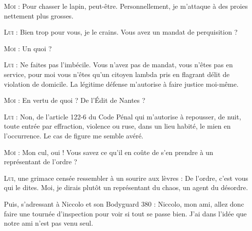 \begin{dialogue}
\textsc{Moi} : Pour chasser le lapin, peut-être. Personnellement, je m’attaque à des proies nettement plus grosses.

\textsc{Lui} : Bien trop pour vous, je le crains. Vous avez un mandat de perquisition ?

\textsc{Moi} : Un quoi ?

\textsc{Lui} : Ne faites pas l’imbécile. Vous n’avez pas de mandat, vous n’êtes pas en service, pour moi vous n’êtes qu’un citoyen lambda pris en flagrant délit de violation de domicile. La légitime défense m’autorise à faire justice moi-même.

\textsc{Moi} : En vertu de quoi ? De l’Édit de Nantes ?

%

\textsc{Lui} : Non, de l’article 122-6 du Code Pénal qui m’autorise à repousser, de nuit, toute entrée par effraction, violence ou ruse, dans un lieu habité, le mien en l’occurrence. Le cas de figure me semble avéré.

\textsc{Moi} : Mon cul, oui ! Vous savez ce qu’il en coûte de s’en prendre à un représentant de l’ordre ?

\textsc{Lui}, une grimace censée ressembler à un sourire aux lèvres : De l’ordre, c’est vous qui le dites. Moi, je dirais plutôt un représentant du chaos, un agent du désordre.

Puis, s’adressant à Niccolo et son Bodyguard 380 : Niccolo, mon ami, allez donc faire une tournée d’inspection pour voir si tout se passe bien. J’ai dans l’idée que notre ami n’est pas venu seul.

\end{dialogue}

